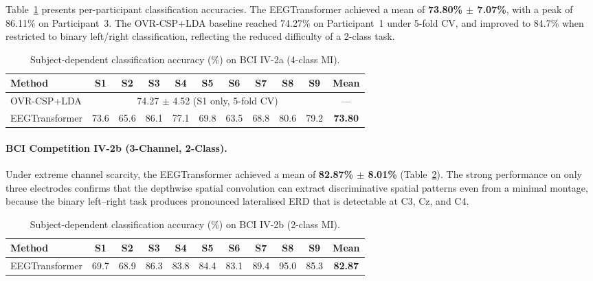 \documentclass[12pt, a4paper]{article}
\begin{document}
Table~\ref{tab:iv2a_results} presents per-participant classification accuracies. The EEGTransformer achieved a mean of \textbf{73.80\% $\pm$ 7.07\%}, with a peak of 86.11\% on Participant~3. The OVR-CSP+LDA baseline reached 74.27\% on Participant~1 under 5-fold CV, and improved to 84.7\% when restricted to binary left/right classification, reflecting the reduced difficulty of a 2-class task.

\begin{table}[htbp]
\centering
\caption{Subject-dependent classification accuracy (\%) on BCI IV-2a (4-class MI).}
\label{tab:iv2a_results}
\begin{tabular}{lcccccccccc}
\toprule
\textbf{Method} & \textbf{S1} & \textbf{S2} & \textbf{S3} & \textbf{S4} & \textbf{S5} & \textbf{S6} & \textbf{S7} & \textbf{S8} & \textbf{S9} & \textbf{Mean} \\
\midrule
OVR-CSP+LDA & \multicolumn{9}{c}{74.27 $\pm$ 4.52 (S1 only, 5-fold CV)} & --- \\
EEGTransformer & 73.6 & 65.6 & 86.1 & 77.1 & 69.8 & 63.5 & 68.8 & 80.6 & 79.2 & \textbf{73.80} \\
\bottomrule
\end{tabular}
\end{table}

\paragraph{BCI Competition IV-2b (3-Channel, 2-Class).}

Under extreme channel scarcity, the EEGTransformer achieved a mean of \textbf{82.87\% $\pm$ 8.01\%} (Table~\ref{tab:iv2b_results}). The strong performance on only three electrodes confirms that the depthwise spatial convolution can extract discriminative spatial patterns even from a minimal montage, because the binary left--right task produces pronounced lateralised ERD that is detectable at C3, Cz, and C4.

\begin{table}[htbp]
\centering
\caption{Subject-dependent classification accuracy (\%) on BCI IV-2b (2-class MI).}
\label{tab:iv2b_results}
\begin{tabular}{lcccccccccc}
\toprule
\textbf{Method} & \textbf{S1} & \textbf{S2} & \textbf{S3} & \textbf{S4} & \textbf{S5} & \textbf{S6} & \textbf{S7} & \textbf{S8} & \textbf{S9} & \textbf{Mean} \\
\midrule
EEGTransformer & 69.7 & 68.9 & 86.3 & 83.8 & 84.4 & 83.1 & 89.4 & 95.0 & 85.3 & \textbf{82.87} \\
\bottomrule
\end{tabular}
\end{table}
\end{document}

